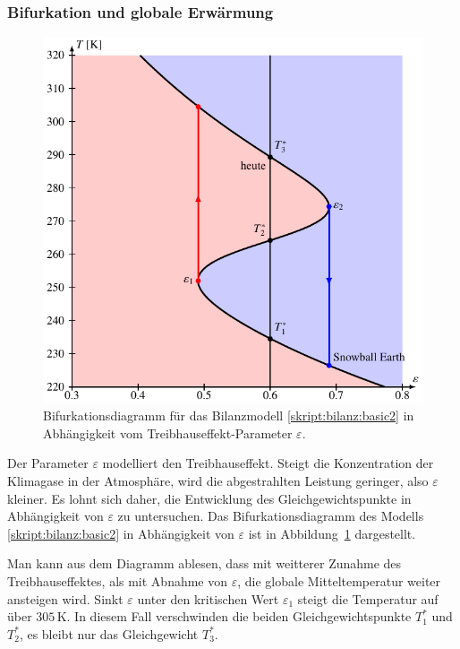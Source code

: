 \subsubsection{Bifurkation und globale Erwärmung}
\begin{figure}
\centering
\includegraphics{chapters/5/bifurkation.pdf}
\caption{Bifurkationsdiagramm für das Bilanzmodell
\eqref{skript:bilanz:basic2}
in Abhängigkeit vom Treibhauseffekt-Parameter $\varepsilon$.
\label{skript:bilanz:bifurkation}}
\end{figure}
Der Parameter $\varepsilon$ modelliert den Treibhauseffekt.
Steigt die Konzentration der Klimagase in der Atmosphäre, wird die
abgestrahlten Leistung geringer, also $\varepsilon$ kleiner.
Es lohnt sich daher, die Entwicklung des Gleichgewichtspunkte in 
Abhängigkeit von $\varepsilon$ zu untersuchen.
Das Bifurkationsdiagramm des Modells
\eqref{skript:bilanz:basic2} in Abhängigkeit von $\varepsilon$
ist in Abbildung~\ref{skript:bilanz:bifurkation} dargestellt.

Man kann aus dem Diagramm ablesen, dass mit weitterer Zunahme des 
Treibhauseffektes, als mit Abnahme von $\varepsilon$, die globale
Mitteltemperatur weiter ansteigen wird.
Sinkt $\varepsilon$ unter den kritischen Wert $\varepsilon_1$ steigt die
Temperatur auf über $305\,\text{K}$.
In diesem Fall verschwinden die beiden Gleichgewichtspunkte $T_1^*$
und $T_2^*$, es bleibt nur das Gleichgewicht $T_3^*$.

